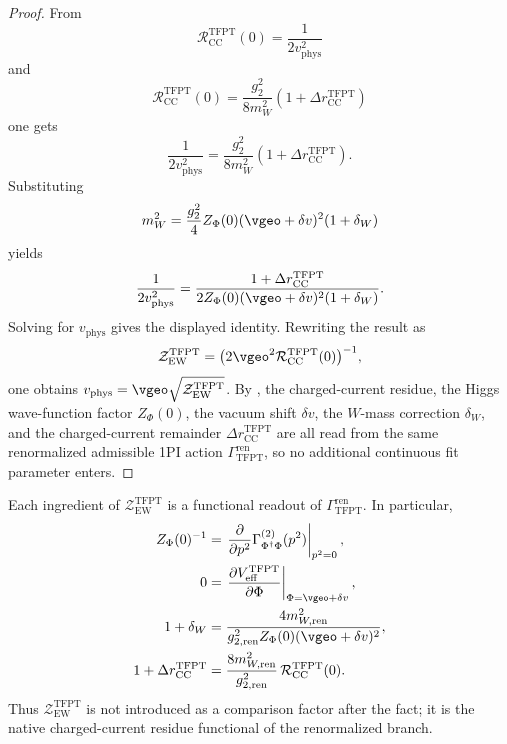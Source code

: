 
\begin{proof}
From
\[
\mathcal R_{\mathrm{CC}}^{\mathrm{TFPT}}(0)=\frac{1}{2v_{\mathrm{phys}}^2}
\]
and
\[
\mathcal R_{\mathrm{CC}}^{\mathrm{TFPT}}(0)=\frac{g_2^2}{8m_W^2}(1+\Delta r_{\mathrm{CC}}^{\mathrm{TFPT}})
\]
one gets
\[
\frac{1}{2v_{\mathrm{phys}}^2}
=
\frac{g_2^2}{8m_W^2}(1+\Delta r_{\mathrm{CC}}^{\mathrm{TFPT}}).
\]
Substituting
\[
m_W^2=
\frac{g_2^2}{4}Z_\Phi(0)(\vgeo+\delta v)^2(1+\delta_W)
\]
yields
\[
\frac{1}{2v_{\mathrm{phys}}^2}
=
\frac{1+\Delta r_{\mathrm{CC}}^{\mathrm{TFPT}}}
{2Z_\Phi(0)(\vgeo+\delta v)^2(1+\delta_W)}.
\]
Solving for $v_{\mathrm{phys}}$ gives the displayed identity. Rewriting the result as
\[
\mathcal Z_{\mathrm{EW}}^{\mathrm{TFPT}}
=
\bigl(2\vgeo^2\mathcal R_{\mathrm{CC}}^{\mathrm{TFPT}}(0)\bigr)^{-1},
\]
one obtains $v_{\mathrm{phys}}=\vgeo\sqrt{\mathcal Z_{\mathrm{EW}}^{\mathrm{TFPT}}}$. By
, the charged-current residue, the Higgs wave-function factor
$Z_\Phi(0)$, the vacuum shift $\delta v$, the $W$-mass correction $\delta_W$, and the charged-current
remainder $\Delta r_{\mathrm{CC}}^{\mathrm{TFPT}}$ are all read from the same renormalized
admissible 1PI action $\Gamma_{\mathrm{TFPT}}^{\mathrm{ren}}$, so no additional continuous fit
parameter enters.
\end{proof}

\begin{remark}
Each ingredient of $\mathcal Z_{\mathrm{EW}}^{\mathrm{TFPT}}$ is a functional readout of
$\Gamma_{\mathrm{TFPT}}^{\mathrm{ren}}$. In particular,
\[
\begin{aligned}
Z_\Phi(0)^{-1}
&=
\left.\frac{\partial}{\partial p^2}\Gamma_{\Phi^\dagger\Phi}^{(2)}(p^2)\right|_{p^2=0},
\\
0
&=
\left.\frac{\partial V_{\mathrm{eff}}^{\mathrm{TFPT}}}{\partial \Phi}\right|_{\Phi=\vgeo+\delta v},
\\
1+\delta_W
&=
\frac{4m_{W,\mathrm{ren}}^2}
{g_{2,\mathrm{ren}}^2Z_\Phi(0)(\vgeo+\delta v)^2},
\\
1+\Delta r_{\mathrm{CC}}^{\mathrm{TFPT}}
&=
\frac{8m_{W,\mathrm{ren}}^2}{g_{2,\mathrm{ren}}^2}\,
\mathcal R_{\mathrm{CC}}^{\mathrm{TFPT}}(0).
\end{aligned}
\]
Thus $\mathcal Z_{\mathrm{EW}}^{\mathrm{TFPT}}$ is not introduced as a comparison factor after the
fact; it is the native charged-current residue functional of the renormalized branch.
\end{remark}


